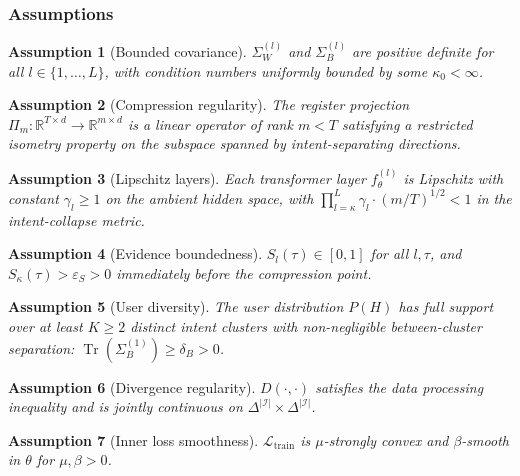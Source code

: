 \documentclass[lettersize,journal]{IEEEtran}
\newtheorem{assumption}{Assumption}
\newcommand{\R}{\mathbb{R}}
\newcommand{\Tr}{\operatorname{Tr}}
\newcommand{\calL}{\mathcal{L}}
\begin{document}
\subsubsection{Assumptions}

\begin{assumption}[Bounded covariance]
\label{asm:covariance}
$\Sigma_W^{(l)}$ and $\Sigma_B^{(l)}$ are positive definite for
all $l \in \{1,\ldots,L\}$, with condition numbers uniformly bounded
by some $\kappa_0 < \infty$.
\end{assumption}

\begin{assumption}[Compression regularity]
\label{asm:compression}
The register projection $\Pi_m : \R^{T \times d} \to \R^{m \times d}$
is a linear operator of rank $m < T$ satisfying a restricted
isometry property on the subspace spanned by intent-separating
directions.
\end{assumption}

\begin{assumption}[Lipschitz layers]
\label{asm:lipschitz}
Each transformer layer $f_\theta^{(l)}$ is Lipschitz with constant
$\gamma_l \geq 1$ on the ambient hidden space, with
$\prod_{l=\kappa}^{L} \gamma_l \cdot (m/T)^{1/2} < 1$
in the intent-collapse metric.
\end{assumption}

\begin{assumption}[Evidence boundedness]
\label{asm:evidence}
$S_l(\tau) \in [0,1]$ for all $l, \tau$, and
$S_\kappa(\tau) > \varepsilon_S > 0$ immediately before
the compression point.
\end{assumption}

\begin{assumption}[User diversity]
\label{asm:diversity}
The user distribution $P(H)$ has full support over at least
$K \geq 2$ distinct intent clusters with non-negligible
between-cluster separation:
$\Tr(\Sigma_B^{(1)}) \geq \delta_B > 0$.
\end{assumption}

\begin{assumption}[Divergence regularity]
\label{asm:divergence}
$D(\cdot,\cdot)$ satisfies the data processing inequality and
is jointly continuous on $\Delta^{|\mathcal{I}|} \times
\Delta^{|\mathcal{I}|}$.
\end{assumption}

\begin{assumption}[Inner loss smoothness]
\label{asm:smooth}
$\calL_{\text{train}}$ is $\mu$-strongly convex and
$\beta$-smooth in $\theta$ for $\mu, \beta > 0$.
\end{assumption}
\end{document}
